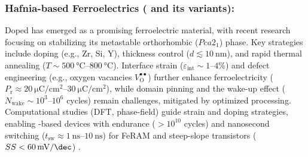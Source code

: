 \documentclass[a4paper,fleqn]{cas-sc}
\begin{document}
\subsubsection*{Hafnia-based Ferroelectrics ( and its variants):} Doped  has emerged as a promising ferroelectric material, with recent research focusing on stabilizing its metastable orthorhombic ($Pca2_{1}$) phase. Key strategies include doping (e.g., Zr, Si, Y), thickness control ($d \lesssim \SI{10}{\nano\meter}$), and rapid thermal annealing ($T \sim \SIrange{500}{800}{\degreeCelsius}$). Interface strain ($\varepsilon_{\text{int}} \sim 1$--$4\%$) and defect engineering (e.g., oxygen vacancies $V_{\text{O}}^{\bullet\bullet}$) further enhance ferroelectricity ($P_{\text{r}} \approx \SIrange{20}{30}{\micro\coulomb\per\centi\meter\squared}$), while domain pinning and the wake-up effect ($N_{\text{wake}} \sim 10^{3}$--$10^{6}$ cycles) remain challenges, mitigated by optimized processing. Computational studies (DFT, phase-field) guide strain and doping strategies, enabling -based devices with endurance ($>10^{10}$ cycles) and nanosecond switching ($t_{\text{sw}} \approx \SIrange{1}{10}{\nano\second}$) for FeRAM and steep-slope transistors ($SS < \SI{60}{\milli\volt\per\dec}$) \cite{shi2023interface,fan2025hidden}.
\end{document}
